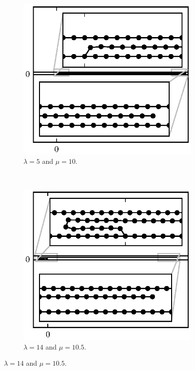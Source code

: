 	\begin{figure}[h!]
		\centering
		\begin{subfigure}{.5\textwidth}
			\centering
			\includegraphics{./fig/ch3/push/ref/l5_m10.eps}
			\caption{$\lambda=5$ and $\mu=10$.\label{subfig:flattened}}
		\end{subfigure}%
		~
		\begin{subfigure}{.5\textwidth}
			\centering
			\includegraphics{./fig/ch3/push/ref/l14_m10.5.eps}
			\caption{$\lambda=14$ and $\mu=10.5$. \label{subfig:flat_loop}}
		\end{subfigure}


\end{figure}
